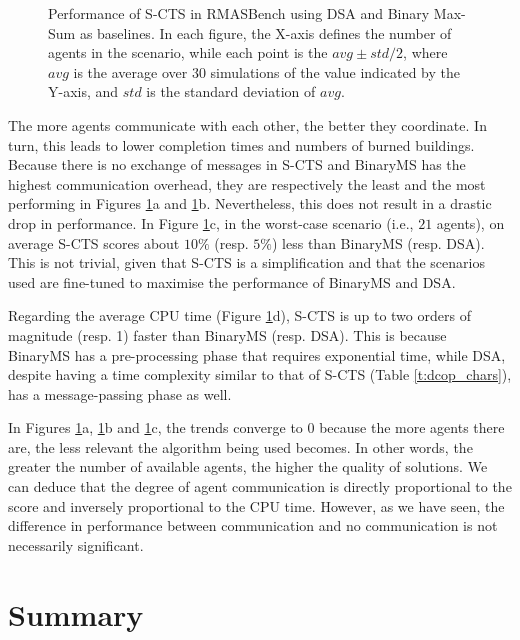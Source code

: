 \begin{figure}[t]
    \centering
    \begin{adjustbox}{width=\textwidth}
        
    \end{adjustbox}
    \caption[Performance of S-CTS in RMASBench]{%
        Performance of S-CTS in RMASBench using DSA and Binary Max-Sum as baselines. In
        each figure, the X-axis defines the number of agents in the scenario, while each
        point is the $avg \pm std/2$, where $avg$ is the average over 30 simulations of
        the value indicated by the Y-axis, and $std$ is the standard deviation of $avg$.}
    \label{fig:c1test2}
\end{figure}

The more agents communicate with each other, the better they coordinate. In turn, this
leads to lower completion times and numbers of burned buildings. Because there is no
exchange of messages in S-CTS and BinaryMS has the highest communication overhead, they
are respectively the least and the most performing in Figures \ref{fig:c1test2}a and
\ref{fig:c1test2}b.
Nevertheless, this does not result in a drastic drop in performance. In Figure
\ref{fig:c1test2}c, in the worst-case scenario (i.e., $21$ agents), on average S-CTS
scores about $10\%$ (resp. $5\%$) less than BinaryMS (resp. DSA). This is not trivial,
given that S-CTS is a simplification and that the scenarios used are fine-tuned to
maximise the performance of BinaryMS and DSA.

Regarding the average CPU time (Figure \ref{fig:c1test2}d), S-CTS is up to two orders of
magnitude (resp. 1) faster than BinaryMS (resp. DSA). This is because BinaryMS has a
pre-processing phase that requires exponential time, while DSA, despite having a time
complexity similar to that of S-CTS (Table \ref{t:dcop_chars}), has a message-passing
phase as well.

In Figures \ref{fig:c1test2}a, \ref{fig:c1test2}b and \ref{fig:c1test2}c, the trends
converge to $0$ because the more agents there are, the less relevant the algorithm being
used becomes. In other words, the greater the number of available agents, the higher the
quality of solutions. We can deduce that the degree of agent communication is directly
proportional to the score and inversely proportional to the CPU time. However, as we have
seen, the difference in performance between communication and no communication is not
necessarily significant.

\section{Summary}

